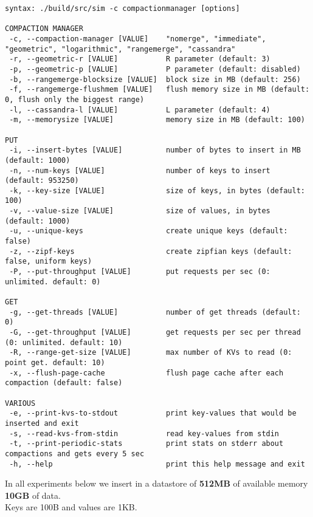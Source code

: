 \documentclass[11pt]{article}
\begin{document}
\footnotesize
\begin{verbatim}
syntax: ./build/src/sim -c compactionmanager [options]

COMPACTION MANAGER
 -c, --compaction-manager [VALUE]    "nomerge", "immediate", "geometric", "logarithmic", "rangemerge", "cassandra"
 -r, --geometric-r [VALUE]           R parameter (default: 3)
 -p, --geometric-p [VALUE]           P parameter (default: disabled)
 -b, --rangemerge-blocksize [VALUE]  block size in MB (default: 256)
 -f, --rangemerge-flushmem [VALUE]   flush memory size in MB (default: 0, flush only the biggest range)
 -l, --cassandra-l [VALUE]           L parameter (default: 4)
 -m, --memorysize [VALUE]            memory size in MB (default: 100)

PUT
 -i, --insert-bytes [VALUE]          number of bytes to insert in MB (default: 1000)
 -n, --num-keys [VALUE]              number of keys to insert (default: 953250)
 -k, --key-size [VALUE]              size of keys, in bytes (default: 100)
 -v, --value-size [VALUE]            size of values, in bytes (default: 1000)
 -u, --unique-keys                   create unique keys (default: false)
 -z, --zipf-keys                     create zipfian keys (default: false, uniform keys)
 -P, --put-throughput [VALUE]        put requests per sec (0: unlimited. default: 0)

GET
 -g, --get-threads [VALUE]           number of get threads (default: 0)
 -G, --get-throughput [VALUE]        get requests per sec per thread (0: unlimited. default: 10)
 -R, --range-get-size [VALUE]        max number of KVs to read (0: point get. default: 10)
 -x, --flush-page-cache              flush page cache after each compaction (default: false)

VARIOUS
 -e, --print-kvs-to-stdout           print key-values that would be inserted and exit
 -s, --read-kvs-from-stdin           read key-values from stdin
 -t, --print-periodic-stats          print stats on stderr about compactions and gets every 5 sec
 -h, --help                          print this help message and exit
\end{verbatim}

In all experiments below we insert in a datastore of \textbf{512MB} of available
memory \textbf{10GB} of data. \\
Keys are 100B and values are 1KB.

\clearpage

\end{document}
